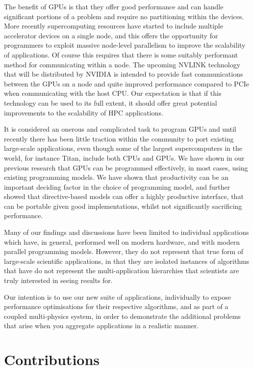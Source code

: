 \documentclass[runningheads,a4paper]{llncs}
\begin{document}
The benefit of GPUs is that they offer good performance and can handle significant portions of a problem and require no partitioning within the devices. More recently supercomputing resources have started to include multiple accelerator devices on a single node, and this offers the opportunity for programmers to exploit massive node-level parallelism to improve the scalability of applications. Of course this requires that there is some suitably performant method for communicating within a node. The upcoming NVLINK technology that will be distributed by NVIDIA is intended to provide fast communications between the GPUs on a node and quite improved performance compared to PCIe when communicating with the host CPU. Our expectation is that if this technology can be used to its full extent, it should offer great potential improvements to the scalability of HPC applications. 

It is considered an onerous and complicated task to program GPUs and until recently there has been little traction within the community to port existing large-scale applications, even though some of the largest supercomputers in the world, for instance Titan, include both CPUs and GPUs. We have shown in our previous research that GPUs can be programmed effectively, in most cases, using existing programming models. We have shown that productivity can be an important deciding factor in the choice of programming model, and further showed that directive-based models can offer a highly productive interface, that can be portable given good implementations, whilst not significantly sacrificing performance.

Many of our findings and discussions have been limited to individual applications which have, in general, performed well on modern hardware, and with modern parallel programming models. However, they do not represent that true form of large-scale scientific applications, in that they are isolated instances of algorithms that have do not represent the multi-application hierarchies that scientists are truly interested in seeing results for.

Our intention is to use our new suite of applications, individually to expose performance optimisations for their respective algorithms, and as part of a coupled multi-physics system, in order to demonstrate the additional problems that arise when you aggregate applications in a realistic manner.

\section{Contributions}
\end{document}
